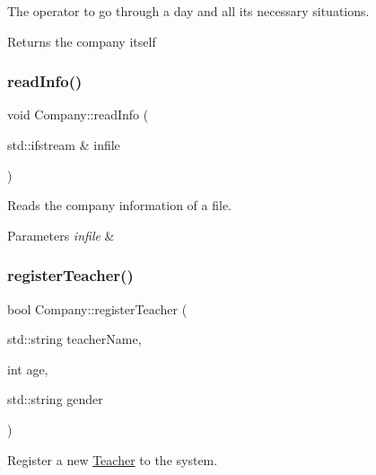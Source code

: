 The operator to go through a day and all its necessary situations. 

\begin{DoxyReturn}{Returns}
the company itself 
\end{DoxyReturn}
\mbox{\label{class_company_a2b97cd4ed80ecab0aa92d0f9c1f81071}} 
\subsubsection{\texorpdfstring{read\+Info()}{readInfo()}}
{\footnotesize\ttfamily void Company\+::read\+Info (\begin{DoxyParamCaption}\item[{std\+::ifstream \&}]{infile }\end{DoxyParamCaption})}



Reads the company information of a file. 


\begin{DoxyParams}{Parameters}
{\em infile} & \\
\hline
\end{DoxyParams}
\mbox{\label{class_company_afd7f0c326672c6bb6a23d5921503bc0d}} 
\subsubsection{\texorpdfstring{register\+Teacher()}{registerTeacher()}}
{\footnotesize\ttfamily bool Company\+::register\+Teacher (\begin{DoxyParamCaption}\item[{std\+::string}]{teacher\+Name,  }\item[{int}]{age,  }\item[{std\+::string}]{gender }\end{DoxyParamCaption})}




\begin{DoxyItemize}
\item Register a new \mbox{\hyperlink{class_teacher}{Teacher}} to the system. 
\end{DoxyItemize}


